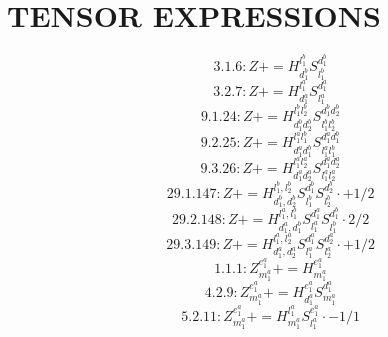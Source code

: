 \documentclass[letterpaper,10pt,fleqn,leqno,onecolumn]{article}
\begin{document}
\section{TENSOR EXPRESSIONS}
\begin{equation} \;\;\;\;\;\;  3.1.6: Z+=H^{l_{1}^{b}}_{d_{1}^{b}}S^{d_{1}^{b}}_{l_{1}^{b}} \end{equation}
\begin{equation} \;\;\;\;\;\;  3.2.7: Z+=H^{l_{1}^{a}}_{d_{1}^{a}}S^{d_{1}^{a}}_{l_{1}^{a}} \end{equation}
\begin{equation} \;\;\;\;\;\;  9.1.24: Z+=H^{l_{1}^{b}l_{2}^{b}}_{d_{1}^{b}d_{2}^{b}}S^{d_{1}^{b}d_{2}^{b}}_{l_{1}^{b}l_{2}^{b}} \end{equation}
\begin{equation} \;\;\;\;\;\;  9.2.25: Z+=H^{l_{1}^{a}l_{1}^{b}}_{d_{1}^{a}d_{1}^{b}}S^{d_{1}^{a}d_{1}^{b}}_{l_{1}^{a}l_{1}^{b}} \end{equation}
\begin{equation} \;\;\;\;\;\;  9.3.26: Z+=H^{l_{1}^{a}l_{2}^{a}}_{d_{1}^{a}d_{2}^{a}}S^{d_{1}^{a}d_{2}^{a}}_{l_{1}^{a}l_{2}^{a}} \end{equation}
\begin{equation} \;\;\;\;\;\;  29.1.147: Z+=H^{l_{1}^{b},l_{2}^{b}}_{d_{1}^{b},d_{2}^{b}}S^{d_{1}^{b}}_{l_{1}^{b}}S^{d_{2}^{b}}_{l_{2}^{b}}\cdot +1/2 \end{equation}
\begin{equation} \;\;\;\;\;\;  29.2.148: Z+=H^{l_{1}^{a},l_{1}^{b}}_{d_{1}^{a},d_{1}^{b}}S^{d_{1}^{a}}_{l_{1}^{a}}S^{d_{1}^{b}}_{l_{1}^{b}}\cdot 2/2 \end{equation}
\begin{equation} \;\;\;\;\;\;  29.3.149: Z+=H^{l_{1}^{a},l_{2}^{a}}_{d_{1}^{a},d_{2}^{a}}S^{d_{1}^{a}}_{l_{1}^{a}}S^{d_{2}^{a}}_{l_{2}^{a}}\cdot +1/2 \end{equation}
\begin{equation} \;\;\;\;\;\;  1.1.1: Z^{e_{1}^{a}}_{m_{1}^{a}}+=H^{e_{1}^{a}}_{m_{1}^{a}} \end{equation}
\begin{equation} \;\;\;\;\;\;  4.2.9: Z^{e_{1}^{a}}_{m_{1}^{a}}+=H^{e_{1}^{a}}_{d_{1}^{a}}S^{d_{1}^{a}}_{m_{1}^{a}} \end{equation}
\begin{equation} \;\;\;\;\;\;  5.2.11: Z^{e_{1}^{a}}_{m_{1}^{a}}+=H^{l_{1}^{a}}_{m_{1}^{a}}S^{e_{1}^{a}}_{l_{1}^{a}}\cdot -1/1 \end{equation}
\end{document}
